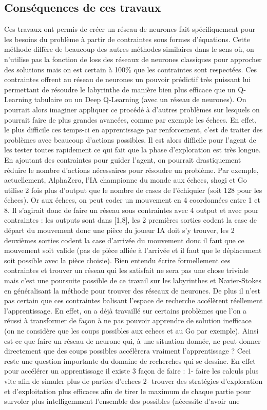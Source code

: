 \documentclass[10pt]{article}
\begin{document}
\subsection{Conséquences de ces travaux}
Ces travaux ont permis de créer un réseau de neurones fait spécifiquement pour les besoins du problème à partir de contraintes sous formes d'équations. Cette méthode diffère de beaucoup des autres méthodes similaires dans le sens où, on n'utilise pas la fonction de loss des réseaux de neurones classiques pour approcher des solutions \cite{diff_eq_with_neural_network} mais on est certain à 100\% que les contraintes sont respectées. Ces contraintes offrent au réseau de neurones un pouvoir prédictif très puissant lui permettant de résoudre le labyrinthe de manière bien plus efficace que un Q-Learning tabulaire ou un Deep Q-Learning (avec un réseau de neurones). On pourrait alors imaginer appliquer ce procédé à d'autres problèmes sur lesquels on pourrait faire de plus grandes avancées, comme par exemple les échecs. En effet, le plus difficile ces temps-ci en apprentissage par renforcement, c'est de traiter des problèmes avec beaucoup d'actions possibles. Il est alors difficile pour l'agent de les tester toutes rapidement ce qui fait que la phase d'exploration est très longue. En ajoutant des contraintes pour guider l'agent, on pourrait drastiquement réduire le nombre d'actions nécessaires pour résoudre un problème. Par exemple, actuellement, AlphaZero, l'IA championne du monde aux échecs, shogi et Go utilise 2 fois plus d'output que le nombre de cases de l'échiquier (soit 128 pour les échecs). Or aux échecs, on peut coder un mouvement en 4 coordonnées entre 1 et 8. Il s'agirait donc de faire un réseau sous contraintes avec 4 output et avec pour contraintes : les outputs sont dans [1,8], les 2 premières sorties codent la case de départ du mouvement donc une pièce du joueur IA doit s'y trouver, les 2 deuxièmes sorties codent la case d'arrivée du mouvement donc il faut que ce mouvement soit valide (pas de pièce alliée à l'arrivée et il faut que le déplacement soit possible avec la pièce choisie). Bien entendu écrire formellement ces contraintes et trouver un réseau qui les satisfait ne sera pas une chose triviale mais c'est une poursuite possible de ce travail sur les labyrinthes et Navier-Stokes en généralisant la méthode pour trouver des réseaux de neurones. De plus il n'est pas certain que ces contraintes balisant l'espace de recherche accélèrent réellement l'apprentissage. En effet, on a déjà travaillé sur certains problèmes que l'on a réussi à transformer de façon à ne pas pouvoir apprendre de solution inefficace (on ne considère que les coups possibles aux echecs et au Go par exemple). Ainsi est-ce que faire un réseau de neurone qui, à une situation donnée, ne peut donner directement que des coups possibles accélèrera vraiment l'apprentissage \cite{hard_constraint}? Ceci reste une question importante du domaine de recherches qui se dessine. En effet pour accélérer un apprentissage il existe 3 façon de faire : 1- faire les calculs plus vite afin de simuler plus de parties d'echecs 2- trouver des stratégies d'exploration et d'exploitation plus efficaces afin de tirer le maximum de chaque partie pour survoler plus intelligemment l'ensemble des possibles (nécessite d'avoir une 
\end{document}

